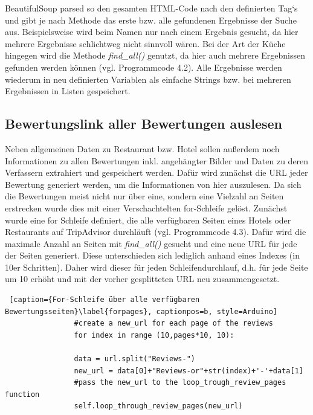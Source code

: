 \documentclass[a4paper,oneside,12pt]{report}
\begin{document}
				BeautifulSoup parsed so den gesamten HTML-Code nach den definierten Tag‘s und gibt je nach Methode das erste bzw. alle gefundenen Ergebnisse der Suche aus. Beispielsweise wird beim Namen nur nach einem Ergebnis gesucht, da hier mehrere Ergebnisse schlichtweg nicht sinnvoll wären. Bei der Art der Küche hingegen wird die Methode \textit{find\_all()} genutzt, da hier auch mehrere Ergebnissen gefunden werden können (vgl. Programmcode 4.2). Alle Ergebnisse werden wiederum in neu definierten Variablen als einfache Strings bzw. bei mehreren Ergebnissen in Listen gespeichert.
	
	
			\subsection{Bewertungslink aller Bewertungen auslesen}
			
				Neben allgemeinen Daten zu Restaurant bzw. Hotel sollen außerdem noch Informationen zu allen Bewertungen inkl. angehängter Bilder und Daten zu deren Verfassern extrahiert und gespeichert werden. Dafür wird zunächst die URL jeder Bewertung generiert werden, um die Informationen von hier auszulesen. Da sich die Bewertungen meist nicht nur über eine, sondern eine Vielzahl an Seiten erstrecken wurde dies mit einer Verschachtelten for-Schleife gelöst.
				\newline
				Zunächst wurde eine for Schleife definiert, die alle verfügbaren Seiten eines Hotels oder Restaurants auf TripAdvisor durchläuft (vgl. Programmcode 4.3). Dafür wird die maximale Anzahl an Seiten mit \textit{find\_all()} gesucht und eine neue URL für jede der Seiten generiert. Diese unterschieden sich lediglich anhand eines Indexes (in 10er Schritten). Daher wird dieser für jeden Schleifendurchlauf, d.h. für jede Seite um 10 erhöht und mit der vorher gesplitteten URL neu zusammengesetzt. 
				\\
				\begin{lstlisting} [caption={For-Schleife über alle verfügbaren Bewertungsseiten}\label{forpages}, captionpos=b, style=Arduino]
				#create a new_url for each page of the reviews
				for index in range (10,pages*10, 10):
				
				data = url.split("Reviews-")
				new_url = data[0]+"Reviews-or"+str(index)+'-'+data[1]
				#pass the new_url to the loop_trough_review_pages function
				self.loop_through_review_pages(new_url)
				\end{lstlisting}
				
\end{document}
